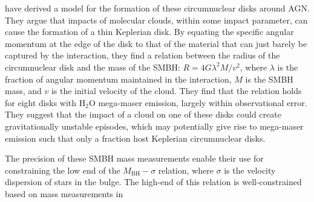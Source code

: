\citet{wardle2012_bhmass} have derived a model for the formation of these circumnuclear disks around AGN. They argue that impacts of molecular clouds, within some impact parameter, can cause the formation of a thin Keplerian disk. By equating the specific angular momentum at the edge of the disk to that of the material that can just barely be captured by the interaction, they find a relation between the radius of the circumnuclear disk and the mass of the SMBH: $R=4G\lambda^2M/v^2$, where $\lambda$ is the fraction of angular momentum maintained in the interaction, $M$ is the SMBH mass, and $v$ is the initial velocity of the cloud. They find that the relation holds for eight disks with H$_2$O mega-maser emission, largely within observational error. They suggest that the impact of a cloud on one of these disks could create gravitationally unstable episodes, which may potentially give rise to mega-maser emission \citep{Milosavljevi_2004} such that only a fraction host Keplerian circumnuclear disks.

The precision of these SMBH mass measurements enable their use for constraining the low end of the $M_{\mathrm{BH}}-\sigma$ relation, where $\sigma$ is the velocity dispersion of stars in the bulge. The high-end of this relation is well-constrained based on mass measurements in 

